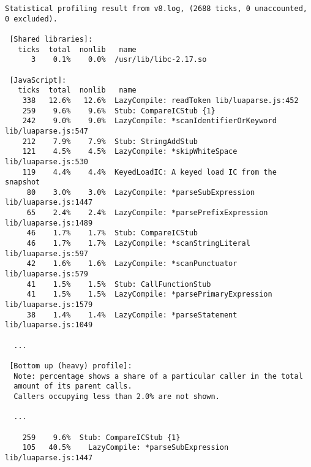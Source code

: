 \footnotesize
\begin{verbatim}
Statistical profiling result from v8.log, (2688 ticks, 0 unaccounted, 0 excluded).

 [Shared libraries]:
   ticks  total  nonlib   name
      3    0.1%    0.0%  /usr/lib/libc-2.17.so

 [JavaScript]:
   ticks  total  nonlib   name
    338   12.6%   12.6%  LazyCompile: readToken lib/luaparse.js:452
    259    9.6%    9.6%  Stub: CompareICStub {1}
    242    9.0%    9.0%  LazyCompile: *scanIdentifierOrKeyword lib/luaparse.js:547
    212    7.9%    7.9%  Stub: StringAddStub
    121    4.5%    4.5%  LazyCompile: *skipWhiteSpace lib/luaparse.js:530
    119    4.4%    4.4%  KeyedLoadIC: A keyed load IC from the snapshot
     80    3.0%    3.0%  LazyCompile: *parseSubExpression lib/luaparse.js:1447
     65    2.4%    2.4%  LazyCompile: *parsePrefixExpression lib/luaparse.js:1489
     46    1.7%    1.7%  Stub: CompareICStub
     46    1.7%    1.7%  LazyCompile: *scanStringLiteral lib/luaparse.js:597
     42    1.6%    1.6%  LazyCompile: *scanPunctuator lib/luaparse.js:579
     41    1.5%    1.5%  Stub: CallFunctionStub
     41    1.5%    1.5%  LazyCompile: *parsePrimaryExpression lib/luaparse.js:1579
     38    1.4%    1.4%  LazyCompile: *parseStatement lib/luaparse.js:1049

  ...

 [Bottom up (heavy) profile]:
  Note: percentage shows a share of a particular caller in the total
  amount of its parent calls.
  Callers occupying less than 2.0% are not shown.

  ...

    259    9.6%  Stub: CompareICStub {1}
    105   40.5%    LazyCompile: *parseSubExpression lib/luaparse.js:1447
\end{verbatim}
